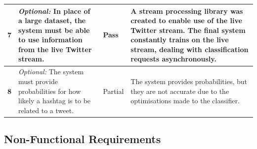 \documentclass[11pt,a4paper]{report}
\begin{document}
\begin{center}
\begin{longtable}{|M{0.4cm}|B{5.2cm}||M{1.3cm}|B{5.2cm}|}
        \hline
        \textbf{7} & \emph{Optional:} In place of a large dataset, the system must be able to use information from the live Twitter stream. & Pass & A stream processing library was created to enable use of the live Twitter stream. The final system constantly trains on the live stream, dealing with classification requests asynchronously. \\
        \hline
        \textbf{8} & \emph{Optional:} The system must provide probabilities for how likely a hashtag is to be related to a tweet. & Partial & The system provides probabilities, but they are not accurate due to the optimisations made to the classifier. \\
    \end{longtable}
\end{center}

\subsection{Non-Functional Requirements}
\end{document}
